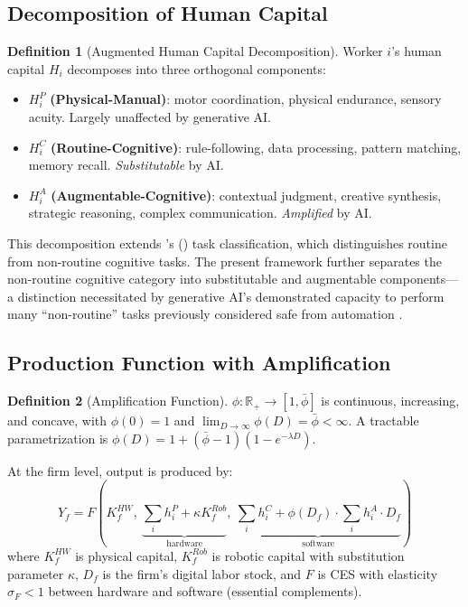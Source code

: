 \documentclass[11pt,a4paper]{article}
\theoremstyle{definition}
\newtheorem{definition}{Definition}
\begin{document}
\subsection{Decomposition of Human Capital}

\begin{definition}[Augmented Human Capital Decomposition]
Worker $i$'s human capital $H_i$ decomposes into three orthogonal components:
\begin{itemize}[leftmargin=*]
\item $H_i^P$ \textbf{(Physical-Manual)}: motor coordination, physical endurance, sensory acuity. Largely unaffected by generative AI.
\item $H_i^C$ \textbf{(Routine-Cognitive)}: rule-following, data processing, pattern matching, memory recall. \textit{Substitutable} by AI.
\item $H_i^A$ \textbf{(Augmentable-Cognitive)}: contextual judgment, creative synthesis, strategic reasoning, complex communication. \textit{Amplified} by AI.
\end{itemize}
\end{definition}

This decomposition extends \citeauthor{autor2003skill}'s (\citeyear{autor2003skill}) task classification, which distinguishes routine from non-routine cognitive tasks. The present framework further separates the non-routine cognitive category into substitutable and augmentable components---a distinction necessitated by generative AI's demonstrated capacity to perform many ``non-routine'' tasks previously considered safe from automation \citep{eloundou2024gpts}.

\subsection{Production Function with Amplification}

\begin{definition}[Amplification Function]
$\phi: \mathbb{R}_+ \to [1, \bar{\phi}]$ is continuous, increasing, and concave, with $\phi(0) = 1$ and $\lim_{D \to \infty} \phi(D) = \bar{\phi} < \infty$. A tractable parametrization is $\phi(D) = 1 + (\bar{\phi} - 1)(1 - e^{-\lambda D})$.
\end{definition}

At the firm level, output is produced by:
\begin{equation}
Y_f = F\!\left(K_f^{HW},\ \underbrace{\textstyle\sum_i h_i^P + \kappa K_f^{Rob}}_{\text{hardware}},\ \underbrace{\textstyle\sum_i h_i^C + \phi(D_f) \cdot \sum_i h_i^A \cdot D_f}_{\text{software}}\right)
\label{eq:production}
\end{equation}
where $K_f^{HW}$ is physical capital, $K_f^{Rob}$ is robotic capital with substitution parameter $\kappa$, $D_f$ is the firm's digital labor stock, and $F$ is CES with elasticity $\sigma_F < 1$ between hardware and software (essential complements).
\end{document}
